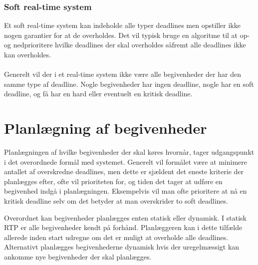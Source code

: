 \subsubsection{Soft real-time system}
Et soft real-time system kan indeholde alle typer deadlines men opstiller ikke nogen garantier for at de overholdes. Det vil typisk bruge en algoritme til at op- og nedprioritere hvilke deadlines der skal overholdes såfremt alle deadlines ikke kan overholdes.\\
\\

Generelt vil der i et real-time system ikke være alle begivenheder der har den samme type af deadline. Nogle begivenheder har ingen deadline, nogle har en soft deadline, og få har en hard eller eventuelt en kritisk deadline. 

\section{Planlægning af begivenheder}
Planlægningen af hvilke begivenheder der skal køres hvornår, tager udgangspunkt i det overordnede formål med systemet. Generelt vil formålet være at minimere antallet af overskredne deadlines, men dette er sjældent det eneste kriterie der planlægges efter, ofte vil prioriteten for, og tiden det tager at udføre en begivenhed indgå i planlægningen. Eksempelvis vil man ofte prioritere at nå en kritisk deadline selv om det betyder at man overskrider to soft deadlines. 


Overordnet kan begivenheder planlægges enten statisk eller dynamisk\cite{cheng1987scheduling}. I statisk RTP er alle begivenheder kendt på forhånd. Planlæggeren kan i dette tilfælde allerede inden start udregne om det er muligt at overholde alle deadlines. Alternativt planlægges begivenhederne dynamisk hvis der uregelmæssigt kan ankomme nye begivenheder der skal planlægges. 

